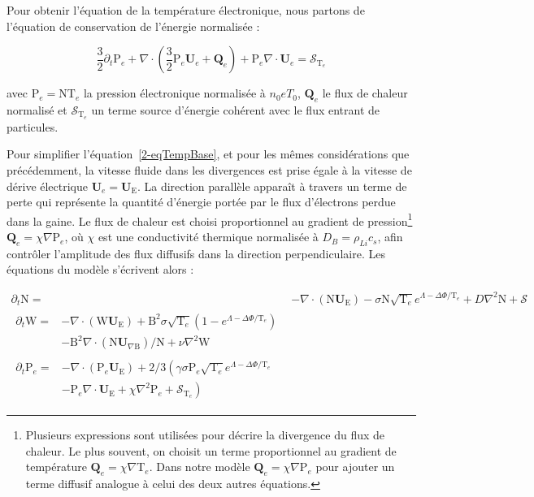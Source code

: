 \begin{refsection}
	Pour obtenir l'équation de la température électronique, nous partons de
	l'équation de conservation de l'énergie normalisée :
	
	\begin{equation} 
	\label{2-eqTempBase}
		\frac{3}{2}\partial_t \text{P}_e +
		\nabla\cdot\left(\frac{3}{2}\text{P}_e\mathbf{U}_e+\mathbf{Q}_e\right) +
		\text{P}_e\nabla\cdot\mathbf{U}_e=\mathcal{S}_{\text{T}_e} 
	\end{equation}
	
	avec $\text{P}_e=\text{NT}_e$ la pression électronique normalisée à $n_0eT_0$,
	$\mathbf{Q}_e$ le flux de chaleur normalisé et $\mathcal{S}_{\text{T}_e}$ un
	terme source d'énergie cohérent avec le flux entrant de particules. 
	
	Pour simplifier l'équation~\ref{2-eqTempBase}, et pour les mêmes
	considérations que précédemment, la vitesse fluide dans les divergences est
	prise égale à la vitesse de dérive électrique $\mathbf U_e=\mathbf
	U_\text{E}$. La direction parallèle apparaît à travers un terme de
	perte qui représente la quantité d'énergie portée par le flux d'électrons
	perdue dans la gaine.
	Le flux de chaleur est choisi proportionnel au gradient de pression\footnote{Plusieurs expressions
	sont utilisées pour décrire la divergence du flux de chaleur. Le plus souvent,
	on choisit un terme proportionnel au gradient de température 
$\mathbf{Q}_e=\chi\nabla\text{T}_e$. Dans
notre modèle $\mathbf{Q}_e=\chi\nabla\text{P}_e$ pour ajouter un terme diffusif
analogue à celui des deux autres équations.}
$\mathbf{Q}_e=\chi\nabla\text{P}_e$, où $\chi$ est une conductivité thermique
normalisée à $D_B=\rho_{Li}c_s$, afin contrôler l'amplitude des flux diffusifs
dans la direction perpendiculaire.
	Les équations du modèle s'écrivent alors :
	
\begin{align}
\label{2-eqContinuiteTemp}
\partial_t \text{N}
=& - \nabla\cdot\left(\text{N}\mathbf U_\text{E}\right) -\sigma
\text{N}\sqrt{\text{T}_e}e^{\Lambda-\Delta\Phi/\text{T}_e} + D\nabla^2 \text{N}
+ \mathcal{S}
\\[0.5cm]
\label{2-eqCourantTemp}
\begin{split}
\partial_{t}\text{W} =& 
-\nabla\cdot\left(\text{W}\mathbf U_\text{E}\right)
+\text{B}^2\sigma\sqrt{\text{T}_e}\left(1-e^{\Lambda-\Delta\Phi/\text{T}_e}\right)\\
&-\text{B}^2\nabla\cdot\left(\text{N}\mathbf
U_{\nabla\text{B}}\right)/\text{N} +\nu\nabla^2\text{W}
\end{split}
\\[0.5cm]
\label{2-eqEnergyTemp}
\begin{split}
\partial_{t}\text{P}_e=&
-\nabla\cdot\left(\text{P}_e\mathbf U_\text{E}\right)
+2/3\left(\gamma\sigma\text{P}_e\sqrt{\text{T}_e}e^{\Lambda-\Delta\Phi/\text{T}_e}\right.\\
&\left.-\text{P}_e\nabla\cdot\mathbf U_\text{E}
+\chi\nabla^2\text{P}_e
+\mathcal{S}_{\text{T}_e}\right)
\end{split}
\end{align}


\end{refsection}
